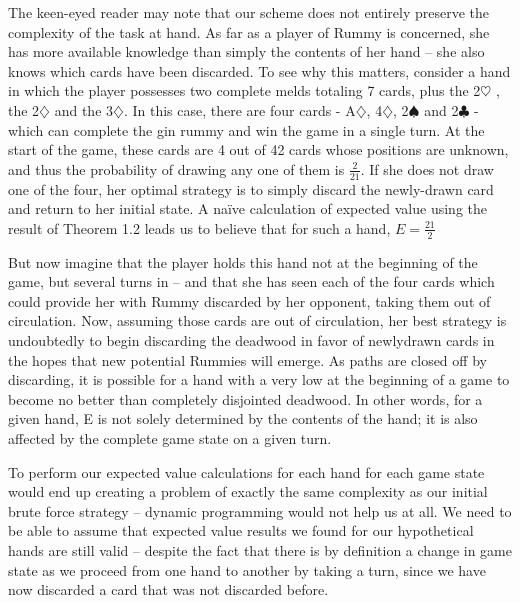 \documentclass[letter,12pt]{article}
\begin{document}
The keen-eyed reader may note that our scheme does not entirely preserve the complexity of the task at hand. As far as a player of Rummy is concerned, she has more available knowledge than simply the contents of her hand – she also knows which cards have been discarded. To see why this matters, consider a hand in which the player possesses two complete melds totaling 7 cards, plus the 2$\heartsuit$ , the 2$\diamondsuit$ and the 3$\diamondsuit$. In this case, there are four cards - A$\diamondsuit$, 4$\diamondsuit$, 2$\spadesuit$ and 2$\clubsuit$ - which can complete the gin rummy and win the game in a single turn. At the start of the game, these cards are 4 out of 42 cards whose positions are unknown, and thus the probability of drawing any one of them is $\frac{2}{21}$. If she does not draw one of the four, her optimal strategy is to simply discard the newly-drawn card and return to her initial state. A naïve calculation of expected value using the result of Theorem 1.2 leads us to believe that for such a hand, $E=\frac{21}{2}$
 
 But now imagine that the player holds this hand not at the beginning of the game, but several turns in – and that she has seen each of the four cards which could provide her with Rummy discarded by her opponent, taking them out of circulation. Now, assuming those cards are out of circulation, her best strategy is undoubtedly to begin discarding the deadwood in favor of newlydrawn cards in the hopes that new potential Rummies will emerge. As paths are closed off by discarding, it is possible for a hand with a very low  at the beginning of a game to become no better than completely disjointed deadwood. In other words, for a given hand, E is not solely determined by the contents of the hand; it is also affected by the complete game state on a given turn. 
 
 To perform our expected value calculations for each hand for each game state would end up creating a problem of exactly the same complexity as our initial brute force strategy – dynamic programming would not help us at all. We need to be able to assume that expected value results we found for our hypothetical hands are still valid – despite the fact that there is by definition a change in game state as we proceed from one hand to another by taking a turn, since we have now discarded a card that was not discarded before. 
\end{document}
